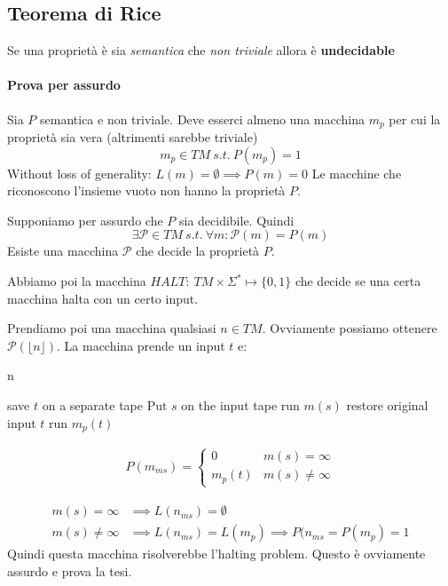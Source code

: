 \documentclass{article}
\newcommand{\floor}[1]{\ensuremath{\lfloor #1 \rfloor}}
\begin{document}
\subsection{Teorema di Rice}
Se una proprietà è sia \textit{semantica} che \textit{non triviale} allora è \textbf{undecidable}

\paragraph{Prova per assurdo}
Sia $P$ semantica e non triviale. Deve esserci almeno una macchina $m_p$ per cui la proprietà sia vera (altrimenti sarebbe triviale)
\begin{equation*}
    m_p\in TM\ s.t.\ P(m_p)=1
\end{equation*}
Without loss of generality: $L(m)=\emptyset\implies P(m)=0$ Le macchine che riconoscono l'insieme vuoto non hanno la proprietà $P$.

Supponiamo per assurdo che $P$ sia decidibile. Quindi
\begin{equation*}
    \exists \mathcal{P} \in TM\ s.t.\ \forall m: \mathcal{P}(m)=P(m)
\end{equation*}
Esiste una macchina $\mathcal{P}$ che decide la proprietà $P$.

Abbiamo poi la macchina $HALT:\ TM\times\Sigma^*\mapsto \{0,1\}$ che decide se una certa macchina halta con un certo input.

Prendiamo poi una macchina qualsiasi $n\in TM$. Ovviamente possiamo ottenere $\mathcal P(\floor{n})$.
La macchina prende un input $t$ e:
\begin{algorithm}
    \caption{n}
    save $t$ on a separate tape\;
    Put $s$ on the input tape\;
    run $m(s)$\;
    restore original input $t$\;
    run $m_p(t)$
\end{algorithm}

\begin{align*}
    P(m_{ms}) = \begin{cases}
        0 & m(s)=\infty \\
        m_p(t) & m(s)\neq\infty
    \end{cases}
\end{align*}

\begin{align*}
    m(s)=\infty &\implies L(n_{ms})=\emptyset \\
    m(s)\neq\infty &\implies L(n_{ms})=L(m_p)\implies P(n_{ms}=P(m_p) = 1
\end{align*}
Quindi questa macchina risolverebbe l'halting problem. Questo è ovviamente assurdo e prova la tesi.
\end{document}
